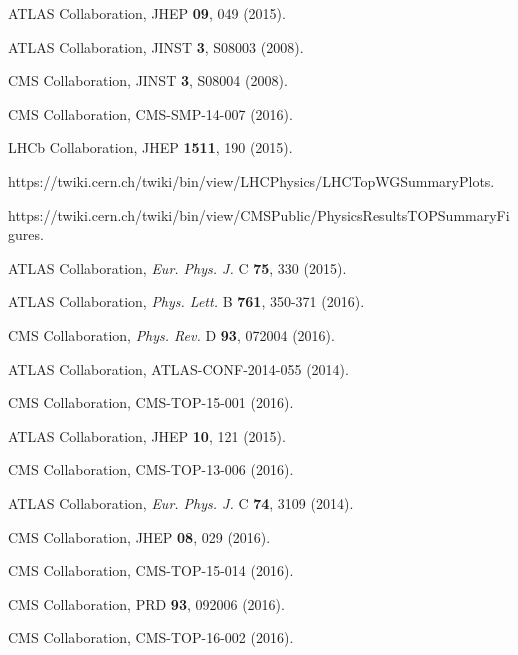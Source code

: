 \documentclass{blois}
\def\Journal#1#2#3#4{{#1} {\bf #2}, #3 (#4)}
\def\PLB{{\em Phys. Lett.}  B}
\def\PRD{{\em Phys. Rev.} D}
\def\EPJC{{\em Eur. Phys. J.} C}
\begin{document}
\begin{thebibliography}{99}

ATLAS Collaboration, \Journal{JHEP}{09}{049}{2015}.

ATLAS Collaboration, \Journal{JINST}{3}{S08003}{2008}.

CMS Collaboration, \Journal{JINST}{3}{S08004}{2008}.

CMS Collaboration, CMS-SMP-14-007 (2016).

LHCb Collaboration, \Journal{JHEP}{1511}{190}{2015}.

https://twiki.cern.ch/twiki/bin/view/LHCPhysics/LHCTopWGSummaryPlots.

https://twiki.cern.ch/twiki/bin/view/CMSPublic/PhysicsResultsTOPSummaryFigures.

ATLAS Collaboration, \Journal{\EPJC}{75}{330}{2015}.

ATLAS Collaboration, \Journal{\PLB}{761}{350-371}{2016}.

CMS Collaboration, \Journal{\PRD}{93}{072004}{2016}.

ATLAS Collaboration, ATLAS-CONF-2014-055 (2014).

CMS Collaboration, CMS-TOP-15-001 (2016).

ATLAS Collaboration, \Journal{JHEP}{10}{121}{2015}.

CMS Collaboration, CMS-TOP-13-006 (2016).

ATLAS Collaboration, \Journal{\EPJC}{74}{3109}{2014}.

CMS Collaboration, \Journal{JHEP}{08}{029}{2016}.

CMS Collaboration, CMS-TOP-15-014 (2016).

CMS Collaboration, \Journal{PRD}{93}{092006}{2016}.

CMS Collaboration, CMS-TOP-16-002 (2016).

\end{thebibliography}
\end{document}
